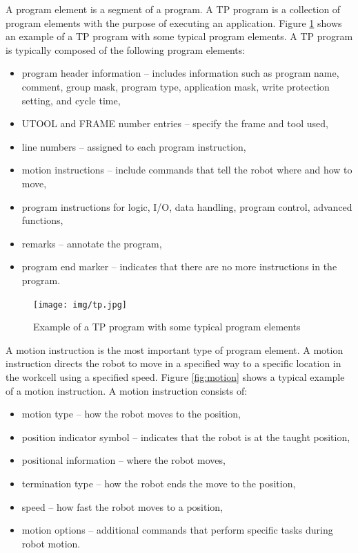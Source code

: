 A program element is a segment of a program. A TP program is a collection of program elements with the purpose of executing an application.  Figure \ref{fig:tp} shows an example of a TP program with some typical program elements. A TP program is typically composed of the following program elements:

\begin{itemize}

\item program header information -- includes information such as program name, comment, group mask, program type, application mask, write protection setting, and cycle time, 
\item UTOOL and FRAME number entries -- specify the frame and tool used,
\item line numbers -- assigned to each program instruction,
\item motion instructions -- include commands that tell the robot where and how to move,
\item program instructions for logic, I/O, data handling, program control, advanced functions,
\item remarks -- annotate the program,
\item program end marker -- indicates that there are no more instructions in the program.

\end{itemize}

\begin{figure}[h]
    \centering
    \texttt{[image: img/tp.jpg]}
    \caption{Example of a TP program with some typical program elements \protect\cite{fanuchandling} }
    \label{fig:tp}
\end{figure}

A motion instruction is the most important type of program element. A motion instruction directs the robot to move in a specified way to a specific location in the workcell using a specified speed. Figure \ref{fig:motion} shows a typical example of a motion instruction. A motion instruction consists of:

\begin{itemize}

\item motion type -- how the robot moves to the position,
\item position indicator symbol -- indicates that the robot is at the taught position,
\item positional information -- where the robot moves,
\item termination type -- how the robot ends the move to the position,
\item speed -- how fast the robot moves to a position,
\item motion options -- additional commands that perform specific tasks during robot motion.

\end{itemize}

